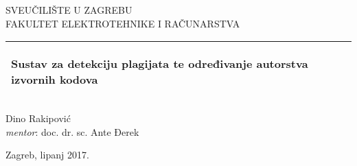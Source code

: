 %
%
%
%
%

\begin{titlepage}

  \begin{center}
	SVEUČILIŠTE U ZAGREBU\\
	\vspace{2mm}
	FAKULTET ELEKTROTEHNIKE I RAČUNARSTVA
  \end{center}
  \vspace{1cm}
  \begin{tabular}{@{}p{\textwidth}@{}}
    \toprule[2pt]
    \midrule
    \vspace{0.2cm}
    \begin{center}
    \Huge{\textbf{
      Sustav za detekciju plagijata te određivanje autorstva izvornih kodova%
    }}
    \end{center}
    
    \vspace{0.2cm}\\
    \midrule
    \toprule[2pt]
  \end{tabular}
  \vspace{4 cm}
  \begin{center}
    {\Large
      Dino Rakipović
    }\\
    \vspace{0.2cm}
    {\large
      \textit{mentor}: doc. dr. sc. Ante Đerek
    }
  \end{center}
  \vfill
  \begin{center}
	Zagreb, lipanj 2017.
  \end{center}
\end{titlepage}
